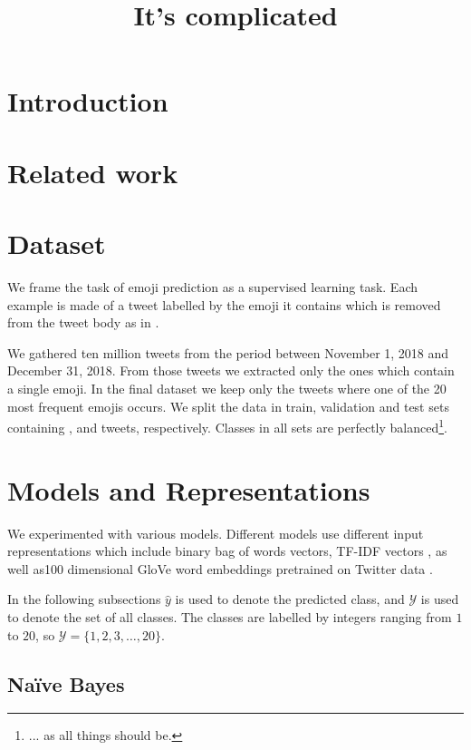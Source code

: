 \documentclass[10pt, a4paper]{article}
\title{It's complicated \emoji{1F384}}
\begin{document}
\maketitleabstract

\section{Introduction}

\section{Related work}

\section{Dataset}

We frame the task of emoji prediction as a supervised learning task. Each 
example is made of a tweet labelled by the emoji it contains which is removed 
from the tweet body as in \citep{barbieri2017emojis}. 

We gathered ten million tweets from the period between November 1, 2018 and 
December 31, 2018. From those tweets we extracted only the ones which contain a 
single emoji. In the final dataset we keep only the tweets where one of the 20 
most frequent emojis occurs. We split the data in train, validation and test 
sets containing ,  and  tweets,
respectively. Classes in all sets are perfectly balanced\footnote{... as all 
things should be.}.

\section{Models and Representations}
\label{sec:models}

We experimented with various models. Different models use different input 
representations which include binary bag of words vectors, TF-IDF vectors 
\citep{manning2008introduction}, as well as100 dimensional GloVe word embeddings
pretrained on Twitter data \citep{pennington2014glove}.

In the following subsections $\hat{y}$ is used to denote the predicted class, 
and $\mathcal{Y}$ is used to denote the set of all classes. The classes are 
labelled by integers ranging from $1$ to $20$, so $\mathcal{Y} = \{1, 2, 3,
\ldots, 20\}$.

\subsection{Na\"{i}ve Bayes}
\end{document}
